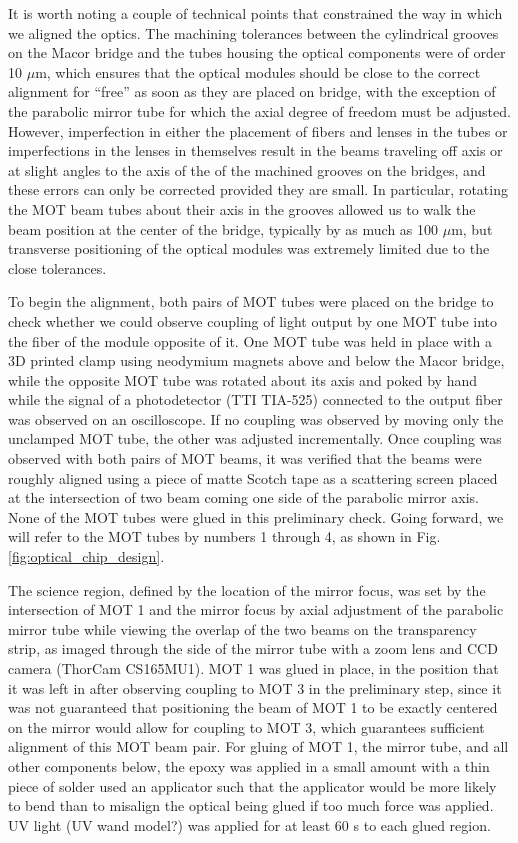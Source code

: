 It is worth noting a couple of technical points that constrained the way in which we aligned the optics. The machining tolerances between the cylindrical grooves on the Macor bridge and the tubes housing the optical components were of order 10 $\mu$m, which ensures that the optical modules should be close to the correct alignment for ``free” as soon as they are placed on bridge, with the exception of the parabolic mirror tube for which the axial degree of freedom must be adjusted. However, imperfection in either the placement of fibers and lenses in the tubes or imperfections in the lenses in themselves result in the beams traveling off axis or at slight angles to the axis of the of the machined grooves on the bridges, and these errors can only be corrected provided they are small. In particular, rotating the MOT beam tubes about their axis in the grooves allowed us to walk the beam position at the center of the bridge, typically by as much as 100 $\mu$m, but transverse positioning of the optical modules was extremely limited due to the close tolerances. 

To begin the alignment, both pairs of MOT tubes were placed on the bridge to check whether we could observe coupling of light output by one MOT tube into the fiber of the module opposite of it. One MOT tube was held in place with a 3D printed clamp using neodymium magnets above and below the Macor bridge, while the opposite MOT tube was rotated about its axis and poked by hand while the signal of a photodetector (TTI TIA-525) connected to the output fiber was observed on an oscilloscope. If no coupling was observed by moving only the unclamped MOT tube, the other was adjusted incrementally. Once coupling was observed with both pairs of MOT beams, it was verified that the beams were roughly aligned using a piece of matte Scotch tape as a scattering screen placed at the intersection of two beam coming one side of the parabolic mirror axis. None of the MOT tubes were glued in this preliminary check. Going forward, we will refer to the MOT tubes by numbers 1 through 4, as shown in Fig. \ref{fig:optical_chip_design}.

The science region, defined by the location of the mirror focus, was set by the intersection of MOT 1 and the mirror focus by axial adjustment of the parabolic mirror tube while viewing the overlap of the two beams on the transparency strip, as imaged through the side of the mirror tube with a zoom lens and CCD camera (ThorCam CS165MU1). MOT 1 was glued in place, in the position that it was left in after observing coupling to MOT 3 in the preliminary step, since it was not guaranteed that positioning the beam of MOT 1 to be exactly centered on the mirror would allow for coupling to MOT 3, which guarantees sufficient alignment of this MOT beam pair. For gluing of MOT 1, the mirror tube, and all other components below, the epoxy was applied in a small amount with a thin piece of solder used an applicator such that the applicator would be more likely to bend than to misalign the optical being glued if too much force was applied. UV light (UV wand model?) was applied for at least 60 s to each glued region.

